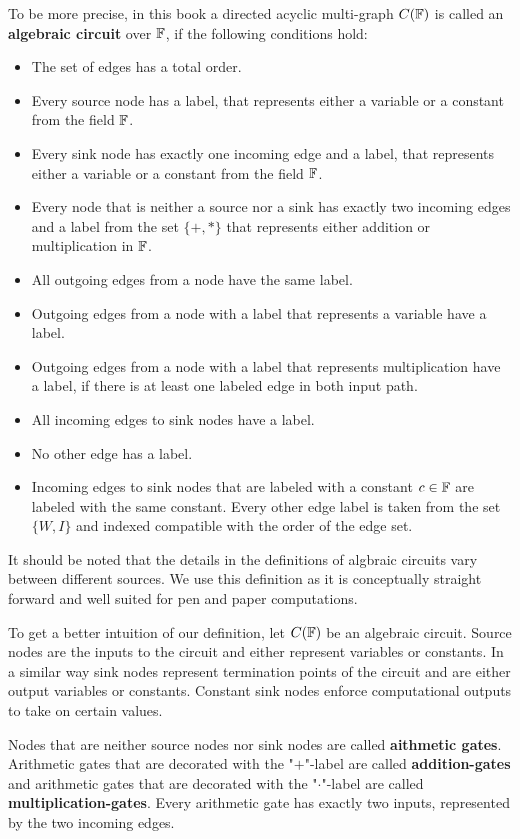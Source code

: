 To be more precise, in this book a directed acyclic multi-graph $C(\mathbb{F})$ is called an \textbf{algebraic circuit} over $\mathbb{F}$, if the following conditions hold:
\begin{itemize}
\item The set of edges has a total order.  
\item Every source node has a label, that represents either a variable or a constant from the field $\mathbb{F}$.
\item Every sink node has exactly one incoming edge and a label, that represents either a variable or a constant from the field $\mathbb{F}$.
\item Every node that is neither a source nor a sink has exactly two incoming edges and a label from the set $\{+,*\}$ that represents either addition or multiplication in $\mathbb{F}$.
\item All outgoing edges from a node have the same label.
\item Outgoing edges from a node with a label that represents a variable have a label.
\item Outgoing edges from a node with a label that represents multiplication have a label, if there is at least one labeled edge in both input path.
\item All incoming edges to sink nodes have a label.
\item No other edge has a label.
\item Incoming edges to sink nodes that are labeled with a constant $c\in\mathbb{F}$ are labeled with the same constant. Every other edge label is taken from the set $\{W,I\}$ and indexed compatible with the order of the edge set. 
\end{itemize} 
It should be noted that the details in the definitions of algbraic circuits vary between different sources. We use this definition as it is conceptually straight forward and well suited for pen and paper computations.

To get a better intuition of our definition, let $C(\mathbb{F})$ be an algebraic circuit. Source nodes are the inputs to the circuit and either represent variables or constants. In a similar way sink nodes represent termination points of the circuit and are either output variables or constants. Constant sink nodes enforce computational outputs to take on certain values.  

Nodes that are neither source nodes nor sink nodes are called \textbf{aithmetic gates}. Arithmetic gates that are decorated with the "$+$"-label are called \textbf{addition-gates} and arithmetic gates that are decorated with the "$\cdot$"-label are called \textbf{multiplication-gates}. Every arithmetic gate has exactly two inputs, represented by the two incoming edges.

